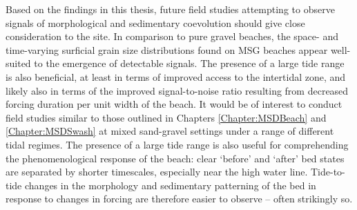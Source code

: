 Based on the findings in this thesis, future field studies attempting to observe signals of morphological and sedimentary coevolution should give close consideration to the site. In comparison to pure gravel beaches, the space- and time-varying surficial grain size distributions found on MSG beaches appear well-suited to the emergence of detectable signals. The presence of a large tide range is also beneficial, at least in terms of improved access to the intertidal zone, and likely also in terms of the improved signal-to-noise ratio resulting from decreased forcing duration per unit width of the beach. It would be of interest to conduct field studies similar to those outlined in Chapters \ref{Chapter:MSDBeach} and \ref{Chapter:MSDSwash} at mixed sand-gravel settings under a range of different tidal regimes. The presence of a large tide range is also useful for comprehending the phenomenological response of the beach: clear `before' and `after' bed states are separated by shorter timescales, especially near the high water line. Tide-to-tide changes in the morphology and sedimentary patterning of the bed in response to changes in forcing are therefore easier to observe -- often strikingly so.
